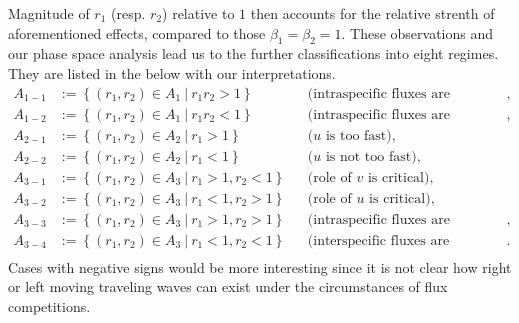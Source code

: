 \documentclass{amsart}
\theoremstyle{definition}
\numberwithin{equation}{section}
\begin{document}
Magnitude of $r_1$ (resp. $r_2$) relative to $1$ then accounts for the relative strenth of aforementioned effects, compared to those $\beta_1=\beta_2=1$.
These observations and our phase space analysis lead us to the further classifications into eight regimes. They are listed in the below with our interpretations.
\begin{equation} \label{class2}
\begin{aligned}
 A_{1-1}&:=\left\{(r_1, r_2) \in A_1 ~|~ r_1r_2> 1\right\} && \text{(intraspecific fluxes are dominant)},\\%
 A_{1-2}&:=\left\{(r_1, r_2) \in A_1 ~|~ r_1r_2 < 1\right\} &&\text{(intraspecific fluxes are dominant)},\\%
 A_{2-1}&:=\left\{(r_1, r_2) \in A_2 ~|~ r_1> 1\right\} && \text{($u$ is too fast)}, \\%
 A_{2-2}&:=\left\{(r_1, r_2) \in A_2 ~|~ r_1< 1\right\} && \text{($u$ is not too fast)},\\ %
 A_{3-1}&:=\left\{(r_1, r_2) \in A_3 ~|~ r_1>1, r_2 < 1\right\}&& \text{(role of $v$ is critical)},\\
 A_{3-2}&:=\left\{(r_1, r_2) \in A_3 ~|~ r_1<1, r_2 > 1\right\}&& \text{(role of $u$ is critical)},\\
 A_{3-3}&:=\left\{(r_1, r_2) \in A_3 ~|~ r_1> 1, r_2 > 1\right\}&& \text{(intraspecific fluxes are dominant)},\\%
 A_{3-4}&:=\left\{(r_1, r_2) \in A_3 ~|~ r_1<1, r_2 < 1\right\}&& \text{(interspecific fluxes are dominant)}.\\%
\end{aligned}
\end{equation}
Cases with negative signs would be more interesting since it is not clear how right or left moving traveling waves can exist under the circumstances of flux competitions. 
\end{document}
